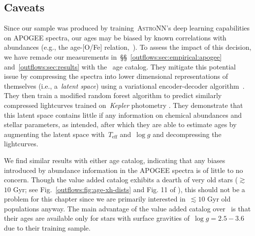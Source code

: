 \subsection{Caveats}
\label{outflows:sec:empirical:caveats}
Since our sample was produced by training~\textsc{AstroNN}'s deep learning
capabilities on APOGEE spectra, our ages may be biased by known correlations
with abundances (e.g., the age-[O/Fe] relation,~\citealt{Feuillet2019}).
To assess the impact of this decision, we have remade our measurements
in~\S\S~\ref{outflows:sec:empirical:apogee} and~\ref{outflows:sec:results}
with the~\citet{Leung2023} age catalog.
They mitigate this potential issue by compressing the spectra into lower
dimensional representations of themselves (i.e., a~\textit{latent space}) using
a variational encoder-decoder algorithm~\citep[e.g.,][]{LeCun2015}.
They then train a modified random forest algorithm to predict similarly
compressed lightcurves trained on~\textit{Kepler} photometry
\citep{Borucki2010}.
They demonstrate that this latent space contains little if any information on
chemical abundances and stellar parameters, as intended, after which they are
able to estimate ages by augmenting the latent space with~$T_\text{eff}$
and~$\log g$ and decompressing the lightcurves.
\par
We find similar results with either age catalog, indicating that any biases
introduced by abundance information in the APOGEE spectra is of little to no
concern.
Though the value added catalog exhibits a dearth of very old stars
($\gtrsim$$10$ Gyr; see Fig.~\ref{outflows:fig:age-xh-dists} and Fig. 11 of
\citealt{Leung2023}), this should not be a problem for this chapter since we
are primarily interested in~$\lesssim$$10$ Gyr old populations anyway.
The main advantage of the value added catalog over~\citet{Leung2023} is that
their ages are available only for stars with surface gravities
of~$\log g = 2.5 - 3.6$ due to their training sample.
